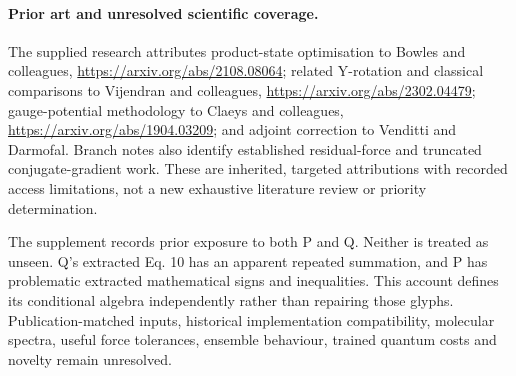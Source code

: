 \documentclass{article}
\begin{document}
\paragraph{Prior art and unresolved scientific coverage.}
The supplied research attributes product-state optimisation to Bowles and colleagues, \url{https://arxiv.org/abs/2108.08064}; related Y-rotation and classical comparisons to Vijendran and colleagues, \url{https://arxiv.org/abs/2302.04479}; gauge-potential methodology to Claeys and colleagues, \url{https://arxiv.org/abs/1904.03209}; and adjoint correction to Venditti and Darmofal. Branch notes also identify established residual-force and truncated conjugate-gradient work. These are inherited, targeted attributions with recorded access limitations, not a new exhaustive literature review or priority determination.

The supplement records prior exposure to both P and Q. Neither is treated as unseen. Q's extracted Eq. 10 has an apparent repeated summation, and P has problematic extracted mathematical signs and inequalities. This account defines its conditional algebra independently rather than repairing those glyphs. Publication-matched inputs, historical implementation compatibility, molecular spectra, useful force tolerances, ensemble behaviour, trained quantum costs and novelty remain unresolved.
\end{document}
